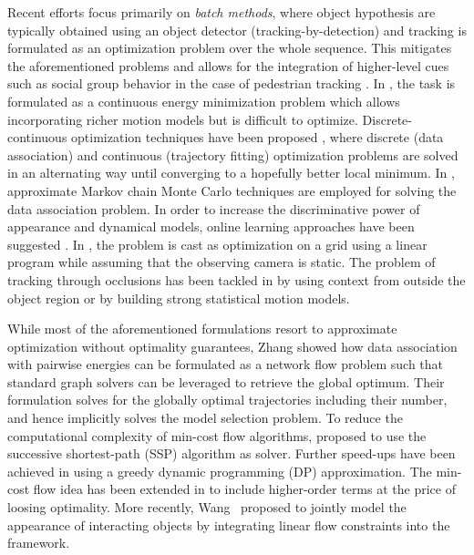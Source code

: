 \documentclass[10pt,twocolumn,letterpaper]{article}
\begin{document}
Recent efforts focus primarily on {\it batch methods}, where object hypothesis are typically obtained using an object detector (tracking-by-detection) and  tracking is formulated as an optimization problem over the whole sequence. This mitigates the aforementioned problems and allows for the integration of higher-level cues such as social group behavior in the case of pedestrian tracking \cite{Choi2012ECCV,Kooij2012ECCV,Leal-Taixe2011ICCVWORK,LealTaixe2014CVPR,Chen2014CVPR,Shi2014CVPR}. In \cite{Andriyenko2011CVPR}, the task is formulated as a continuous energy minimization problem which allows incorporating richer motion models but is difficult to optimize. Discrete-continuous optimization techniques have been proposed \cite{Andriyenko2012CVPR,Milan2013CVPR}, where discrete (data association) and continuous (trajectory fitting) optimization problems are solved in an alternating way until converging to a hopefully better local minimum. 
In \cite{Benfold2011CVPR,Brau2013ICCV,Choi2013PAMI,Yang2014CVPR,Collins2014ECCV}, approximate Markov chain Monte Carlo techniques are employed for solving the data association problem. In order to increase the discriminative power of appearance and dynamical models, online learning approaches have been suggested \cite{Leal-Taixe2012CVPR,Li2009CVPRa,Yang2011CVPR,Song2010ECCV,Yang2012CVPR,Yang2012ECCV,Yu2013CVPR,Zhang2013CVPR}. 
In \cite{Berclaz2011PAMI,Shitrit2013PAMI}, the problem is cast as optimization on a grid using a linear program while assuming that the observing camera is static.
The problem of tracking through occlusions has been tackled in \cite{Idrees2012ECCV,Xiong2012ECCV,Xing2009CVPR,Liu2013CVPR,Dicle2013ICCV,Chen2014CVPR,Bae2014CVPR,Wen2014CVPR,Possegger2014CVPR} by using context from outside the object region or by building strong statistical motion models.

While most of the aforementioned formulations resort to approximate optimization without optimality guarantees,
Zhang \etal \cite{Zhang2008CVPR} showed how data association with pairwise energies can be formulated as a network flow problem such that standard graph solvers can be leveraged to retrieve the global optimum. Their formulation solves for the globally optimal trajectories including their number, and hence implicitly solves the model selection problem.
To reduce the computational complexity of min-cost flow algorithms,  \cite{Berclaz2011PAMI,Pirsiavash2011CVPR} proposed to use the successive shortest-path (SSP) algorithm as solver. Further speed-ups have been achieved in \cite{Pirsiavash2011CVPR} using a greedy dynamic programming (DP) approximation.
The min-cost flow idea has been extended in \cite{Butt2013CVPR,Arora2013ICCV} to include higher-order terms  at the price of loosing optimality. More recently, Wang \etal\, \cite{Wang2014ECCV} proposed to jointly model the appearance of interacting objects by integrating linear flow constraints into the framework.
\end{document}
